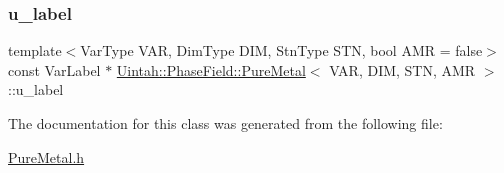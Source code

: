 \subsubsection{\texorpdfstring{u\+\_\+label}{u\_label}}
{\footnotesize\ttfamily template$<$Var\+Type V\+AR, Dim\+Type D\+IM, Stn\+Type S\+TN, bool A\+MR = false$>$ \\
const Var\+Label $\ast$ \hyperlink{classUintah_1_1PhaseField_1_1PureMetal}{Uintah\+::\+Phase\+Field\+::\+Pure\+Metal}$<$ V\+AR, D\+IM, S\+TN, A\+MR $>$\+::u\+\_\+label\hspace{0.3cm}{\ttfamily [protected]}}



The documentation for this class was generated from the following file\+:\begin{DoxyCompactItemize}
\item 
\hyperlink{PureMetal_8h}{Pure\+Metal.\+h}\end{DoxyCompactItemize}
